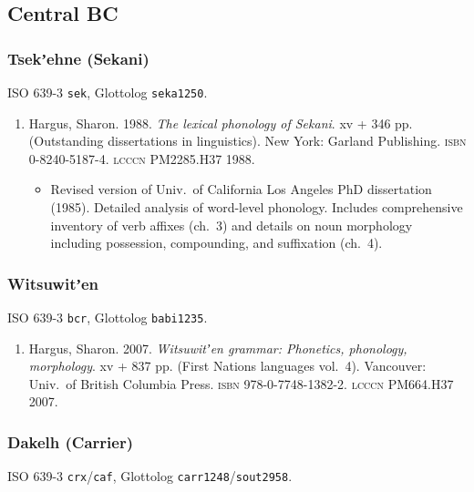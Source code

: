\documentclass[12pt,letterpaper,oneside,article]{memoir}
\begin{document}
\subsection{Central BC}\label{sec:dene-cord-cbc}

\subsubsection{Tsekʼehne (Sekani)}\label{sec:sekani}

ISO 639-3 \texttt{sek}, Glottolog \texttt{seka1250}.

\begin{enumerate}
\item	Hargus, Sharon.
	1988.
	\textit{The lexical phonology of Sekani}.
	xv + 346 pp.
	(Outstanding dissertations in linguistics).
	New York: Garland Publishing.
	\textsc{isbn} 0-8240-5187-4.
	\textsc{lcccn} PM2285.H37 1988.
	\begin{itemize}
	\item	Revised version of Univ.\ of California Los Angeles PhD dissertation (1985).
		Detailed analysis of word-level phonology.
		Includes comprehensive inventory of verb affixes (ch.\ 3) and
		details on noun morphology including possession, compounding, and
		suffixation (ch.\ 4).
	\end{itemize}
\end{enumerate}

\subsubsection{Witsuwitʼen}\label{sec:witsuwiten}

ISO 639-3 \texttt{bcr}, Glottolog \texttt{babi1235}.

\begin{enumerate}
\item	Hargus, Sharon.
	2007.
	\textit{Witsuwitʼen grammar: Phonetics, phonology, morphology}.
	xv + 837 pp.
	(First Nations languages vol.\ 4).
	Vancouver: Univ.\ of British Columbia Press.
	\textsc{isbn} 978-0-7748-1382-2.
	\textsc{lcccn} PM664.H37 2007.
\end{enumerate}

\subsubsection{Dakelh (Carrier)}\label{sec:carrier}

ISO 639-3 \texttt{crx}/\texttt{caf}, Glottolog \texttt{carr1248}/\texttt{sout2958}.
\end{document}
